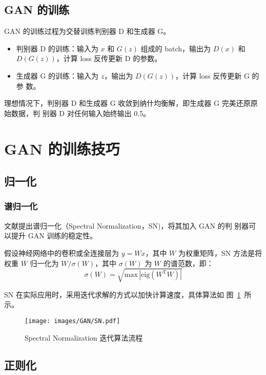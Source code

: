 \subsection{GAN 的训练}

GAN 的训练过程为交替训练判别器 D 和生成器 G。

\begin{itemize}
  \item 判别器 D 的训练：输入为 $x$ 和 $G(z)$ 组成的 batch，输出为 $D(x)$ 和
    $D(G(z))$，计算 loss 反传更新 D 的参数。
  \item 生成器 G 的训练：输入为 $z$，输出为 $D(G(z))$，计算 loss 反传更新 G 的参
    数。
\end{itemize}

理想情况下，判别器 D 和生成器 G 收敛到纳什均衡解，即生成器 G 完美还原原始数据，判
别器 D 对任何输入始终输出 0.5。

\section{GAN 的训练技巧}
\subsection{归一化}
\subsubsection{谱归一化}
文献提出谱归一化（Spectral Normalization，SN)，将其加入 GAN 的判
别器可以提升 GAN 训练的稳定性。

假设神经网络中的卷积或全连接层为 $y = Wx$，其中 $W$ 为权重矩阵，SN 方法是将权重
$W$ 归一化为 $W/\sigma(W)$，其中 $\sigma(W)$ 为 $W$ 的谱范数，即：
\begin{equation}
  \sigma(W) = \sqrt{\mathrm{max} \, \left | \mathrm{eig} (W^{\mathrm{T}} W) \right |}
\end{equation}

SN 在实际应用时，采用迭代求解的方式以加快计算速度，具体算法如
图~\ref{fig:sn-algo}~所示。

\begin{figure}[ht]
  \centering
  \texttt{[image: images/GAN/SN.pdf]}
  \caption{Spectral Normalization 迭代算法流程}
  \label{fig:sn-algo}
\end{figure}

\subsection{正则化}
